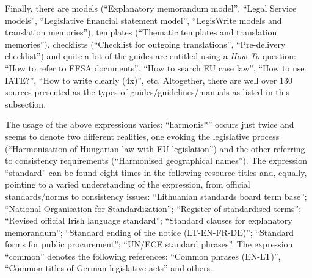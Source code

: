 \documentclass[output=paper]{langsci/langscibook}
\begin{document}
Finally, there are models (“Explanatory memorandum model”, “Legal Service models”, “Legislative financial statement model”, “LegisWrite models and translation memories”), templates (“Thematic templates and translation memories”), checklists (“Checklist for outgoing translations”, “Pre-delivery checklist”) and quite a lot of the guides are entitled using a \textit{How To} question: “How to refer to EFSA documents”, “How to search EU case law”, “How to use IATE?”, “How to write clearly (4x)”, etc. Altogether, there are well over 130 sources presented as the types of guides/guidelines/manuals as listed in this subsection.


The usage of the above expressions varies: “harmonis*” occurs just twice and seems to denote two different realities, one evoking the legislative process (“Harmonisation of Hungarian law with EU legislation”) and the other referring to consistency requirements (“Harmonised geographical names”). The expression “standard” can be found eight times in the following resource titles and, equally, pointing to a varied understanding of the expression, from official standards/norms to consistency issues: “Lithuanian standards board term base”; “National Organisation for Standardization”; “Register of standardised terms”; “Revised official Irish language standard”; “Standard clauses for explanatory memorandum”; “Standard ending of the notice (LT-EN-FR-DE)”; “Standard forms for public procurement”; “UN/ECE standard phrases”. The expression “common” denotes the following references: “Common phrases (EN-LT)”, “Common titles of German legislative acts” and others.

\end{document}
